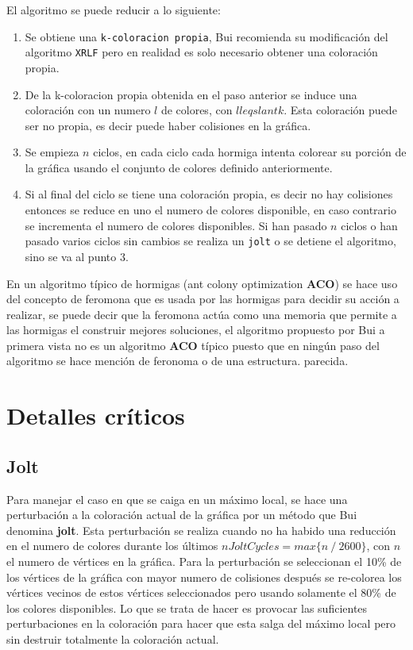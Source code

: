 \documentclass{article}
\begin{document}
El algoritmo se puede reducir a lo siguiente:
\begin{enumerate}
  \item Se obtiene una \texttt{k-coloracion propia}, Bui recomienda su modificación del algoritmo \texttt{XRLF} pero en realidad es solo necesario obtener una coloración propia.
  \item De la k-coloracion propia obtenida en el paso anterior se induce una coloración con un numero $l$ de colores, con $l leqslant k$. Esta coloración puede ser no propia, es decir puede haber colisiones en la gráfica.
  \item Se empieza $n$ ciclos, en cada ciclo cada hormiga intenta colorear su porción de la gráfica usando el conjunto de colores definido anteriormente.
  \item Si al final del ciclo se tiene una coloración propia, es decir no hay colisiones entonces se reduce en uno el numero de colores disponible, en caso contrario se incrementa el numero de colores disponibles. Si han pasado $n$ ciclos o han pasado varios ciclos sin cambios se realiza un \texttt{jolt} o se detiene el algoritmo, sino se va al punto 3.
\end{enumerate}

En un algoritmo típico de hormigas (ant colony optimization \textbf{ACO}) se hace uso del concepto de feromona que es usada por las hormigas para decidir su acción a realizar, se puede decir que la feromona actúa como una memoria que permite a las hormigas el construir mejores soluciones, el algoritmo propuesto por Bui a primera vista no es un algoritmo \textbf{ACO} típico puesto que en ningún paso del algoritmo se hace mención de feronoma o de una estructura. parecida.

\section{Detalles críticos}

\subsection{Jolt}
Para manejar el caso en que se caiga en un máximo local, se hace una perturbación a la coloración actual de la gráfica por un método que Bui denomina \textbf{jolt}. Esta perturbación se realiza cuando no ha habido una reducción en el numero de colores durante los últimos $nJoltCycles = max \{n\ /\ 2600\}$, con $n$ el numero de vértices en la gráfica.
Para la perturbación se seleccionan el 10\% de los vértices de la gráfica con mayor numero de colisiones después se re-colorea los vértices vecinos de estos vértices seleccionados pero usando solamente el 80\% de los colores disponibles. Lo que se trata de hacer es provocar las suficientes perturbaciones en la coloración para hacer que esta salga del máximo local pero sin destruir totalmente la coloración actual.
\end{document}
